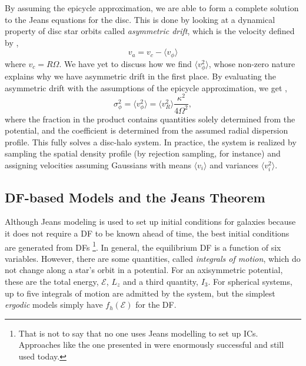 By assuming the epicycle approximation, we are able to form a complete solution to the Jeans equations for the disc. This is done by looking at a dynamical property of disc star orbits called \textit{asymmetric drift}, which is the velocity defined by \citep{BT},
\begin{equation}
v_a = v_c -  \langle v_\phi \rangle
\end{equation}
where $v_c = R \Omega$. We have yet to discuss how we find $\langle v_\phi^2 \rangle$, whose non-zero nature explains why we have asymmetric drift in the first place. By evaluating the asymmetric drift with the assumptions of the epicycle approximation, we get \citep{hernquist_1993},
\begin{equation}
\sigma_\phi^2 = \langle v_\phi^2 \rangle = \langle v_R^2 \rangle \frac{\kappa^2}{4 \Omega^2},
\end{equation}
where the fraction in the product contains quantities solely determined from the potential, and the coefficient is determined from the assumed radial dispersion profile. This fully solves a disc-halo system. In practice, the system is realized by sampling the spatial density profile (by rejection sampling, for instance) and assigning velocities assuming Gaussians with means $\langle v_i \rangle$ and variances $\langle v_i^2 \rangle$. 

\subsection{DF-based Models and the Jeans Theorem}

Although Jeans modeling is used to set up initial conditions for galaxies because it does not require a DF to be known ahead of time, the best initial conditions are generated from DFs \footnote{That is not to say that no one uses Jeans modelling to set up ICs. Approaches like the one presented in \citet{hernquist_1993} were enormously successful and still used today.}. In general, the equilibrium DF is a function of six variables. However, there are some quantities, called \textit{integrals of motion}, which do not change along a star's orbit in a potential. For an axisymmetric potential, these are the total energy, $\mathcal{E}$, $L_z$ and a third quantity, $I_3$.  
For spherical systems, up to five integrals of motion are admitted by the system, but the simplest \textit{ergodic} models simply have $f_{h}(\mathcal{E})$ for the DF. 


